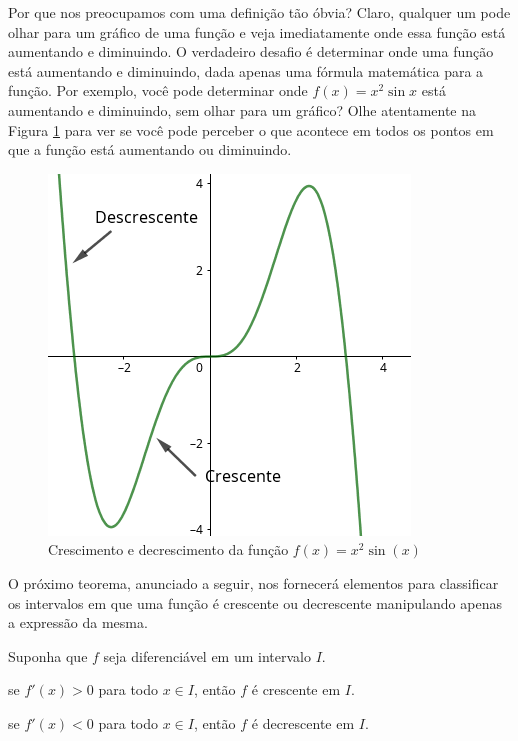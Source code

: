 \cleardoublepage\documentclass[../main.tex]{subfiles}
\begin{document}
Por que nos preocupamos com uma definição tão óbvia? Claro, qualquer um pode olhar para um
gráfico de uma função e veja imediatamente onde essa função está aumentando e diminuindo. O verdadeiro desafio é determinar onde uma função está aumentando e diminuindo, dada apenas uma fórmula matemática para a função. Por exemplo, você pode determinar onde $f (x) = x^2 \sin x$ está aumentando e diminuindo, sem olhar para um gráfico? Olhe atentamente na Figura \ref{Fig:FuncCrescDecresc}    para ver se você pode perceber o que acontece em todos os pontos em que a função está aumentando ou diminuindo. 
\begin{figure}[!htb]
    \centering
    \includegraphics[scale=0.6]{fig_apl_deriv/Cresc_Decresc.png}
    \caption{Crescimento e decrescimento da função $f(x)=x^2\sin (x)$}
    \label{Fig:FuncCrescDecresc}
\end{figure}

O próximo teorema, anunciado a seguir, nos fornecerá elementos para classificar os intervalos em que uma função é crescente ou decrescente manipulando apenas a expressão da mesma.
\begin{teo}
Suponha que $f$ seja diferenciável em um intervalo $I$.
\begin{compactenum}[(i)]
\item se  $f'(x)> 0$ para todo $ x\in I$, então $f$ é crescente em $I$.
\item  se $f'(x) <0$ para todo $ x\in I$, então $f$ é decrescente em $I$.
\end{compactenum}
\end{teo}
\end{document}
